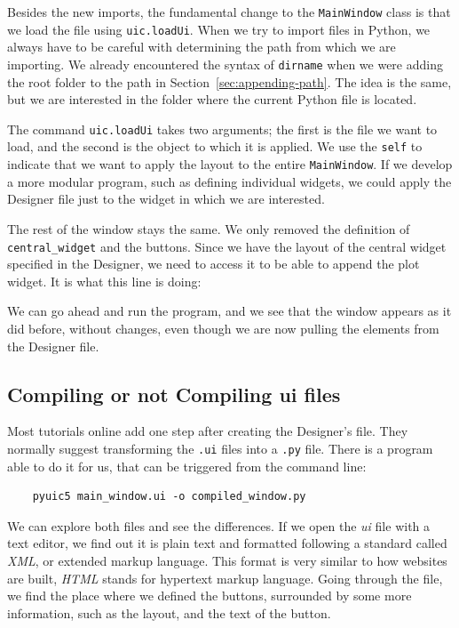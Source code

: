 Besides the new imports, the fundamental change to the \texttt{MainWindow} class is that we load the file using \texttt{uic.loadUi}. When we try to import files in Python, we always have to be careful with determining the path from which we are importing. We already encountered the syntax of \texttt{dirname} when we were adding the root folder to the path in Section~\ref{sec:appending-path}. The idea is the same, but we are interested in the folder where the current Python file is located.

The command \texttt{uic.loadUi} takes two arguments; the first is the file we want to load, and the second is the object to which it is applied. We use the \texttt{self} to indicate that we want to apply the layout to the entire \texttt{MainWindow}. If we develop a more modular program, such as defining individual widgets, we could apply the Designer file just to the widget in which we are interested.

The rest of the window stays the same. We only removed the definition of \texttt{central\_widget} and the buttons. Since we have the layout of the central widget specified in the Designer, we need to access it to be able to append the plot widget. It is what this line is doing:


We can go ahead and run the program, and we see that the window appears as it did before, without changes, even though we are now pulling the elements from the Designer file.

\subsection{Compiling or not Compiling ui files}\label{subsec:compiling-or-not-compiling-ui-files}
Most tutorials online add one step after creating the Designer's file. They normally suggest transforming the \texttt{.ui} files into a \texttt{.py} file. There is a program able to do it for us, that can be triggered from the command line:

\begin{verbatim}
    pyuic5 main_window.ui -o compiled_window.py
\end{verbatim}

We can explore both files and see the differences. If we open the \emph{ui} file with a text editor, we find out it is plain text and formatted following a standard called \emph{XML}, or extended markup language. This format is very similar to how websites are built, \emph{HTML} stands for hypertext markup language. Going through the file, we find the place where we defined the buttons, surrounded by some more information, such as the layout, and the text of the button.

